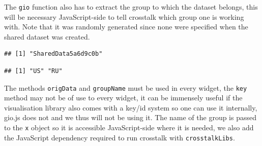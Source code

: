 \documentclass[
]{krantz}
\makeatletter
\newenvironment{Shaded}{\begin{snugshade}}{\end{snugshade}}
\newcommand{\CommentTok}[1]{\textcolor[rgb]{0.37,0.37,0.37}{\textit{#1}}}
\newcommand{\KeywordTok}[1]{\textcolor[rgb]{0.27,0.27,0.27}{\textbf{#1}}}
\newcommand{\NormalTok}[1]{#1}
\newcommand{\OperatorTok}[1]{\textcolor[rgb]{0.43,0.43,0.43}{\textbf{#1}}}
\newenvironment{kframe}{%
\medskip{}
\setlength{\fboxsep}{.8em}
 \def\at@end@of@kframe{}%
 \ifinner\ifhmode%
  \def\at@end@of@kframe{\end{minipage}}%
  \begin{minipage}{\columnwidth}%
 \fi\fi%
 \def\FrameCommand##1{\hskip\@totalleftmargin \hskip-\fboxsep
 \colorbox{shadecolor}{##1}\hskip-\fboxsep
     \hskip-\linewidth \hskip-\@totalleftmargin \hskip\columnwidth}%
 \MakeFramed {\advance\hsize-\width
   \@totalleftmargin\z@ \linewidth\hsize
   \@setminipage}}%
 {\par\unskip\endMakeFramed%
 \at@end@of@kframe}
\renewenvironment{Shaded}{\begin{kframe}}{\end{kframe}}
\makeatother
\begin{document}
The \texttt{gio} function also has to extract the group to which the dataset belongs, this will be necessary JavaScript-side to tell crosstalk which group one is working with. Note that it was randomly generated since none were specified when the shared dataset was created.

\begin{Shaded}
\end{Shaded}

\begin{verbatim}
## [1] "SharedData5a6d9c0b"
\end{verbatim}

\begin{Shaded}
\end{Shaded}

\begin{verbatim}
## [1] "US" "RU"
\end{verbatim}

The methods \texttt{origData} and \texttt{groupName} must be used in every widget, the \texttt{key} method may not be of use to every widget, it can be immensely useful if the visualisation library also comes with a key/id system so one can use it internally, gio.js does not and we thus will not be using it. The name of the group is passed to the \texttt{x} object so it is accessible JavaScript-side where it is needed, we also add the JavaScript dependency required to run crosstalk with \texttt{crosstalkLibs}.
\end{document}
